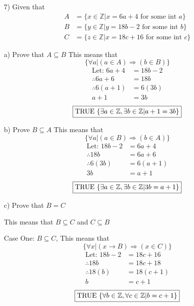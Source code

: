 \documentclass[11pt]{article}
\newcommand*{\mybox}[1]{\framebox{#1}}
\begin{document}
\begin{flushleft}

7) Given that
\vspace{-5mm}
\begin{align*}
A &= \{ x \in \mathbb{Z} | x=6a+4 \text{ for some int }a \}\\
B &= \{ y \in \mathbb{Z} | y=18b-2 \text{ for some int }b \}\\
C &= \{ z \in \mathbb{Z} | x=18c+16 \text{ for some int }c \}
\end{align*}

a) Prove that $A\subseteq B$
\vspace{-5mm}
This means that $$\{ \forall a | (a\in A)\Rightarrow (b\in B)\}$$
\vspace{-9mm}
\begin{align*}
\text{Let: }6a+4 &= 18b-2\\
\therefore 6a+6 &= 18b\\
\therefore 6(a+1) &= 6(3b)\\
a+1&=3b
\end{align*}
\vspace{-7mm}
$$\text{\mybox{TRUE $\{ \exists a \in \mathbb{Z} , \exists b \in \mathbb{Z} | a+1=3b \}  $}}$$

b) Prove $B\subseteq A$ 
\vspace{-5mm}
This means that $$\{ \forall a | (a\in B)\Rightarrow (b\in A)\}$$
\vspace{-9mm}
\begin{align*}
\text{Let: } 18b-2 &= 6a+4\\
\therefore 18b &= 6a+6\\
\therefore 6(3b) &= 6(a+1)\\
3b&=a+1
\end{align*}
\vspace{-7mm}
$$\text{\mybox{TRUE $\{ \exists a \in \mathbb{Z} , \exists b \in \mathbb{Z} | 3b=a+1 \}  $}}$$

c) Prove that $B=C$ 

This means that $B\subseteq C$ and $C\subseteq B$

Case One: $B\subseteq C$, This means that $$\{ \forall x | (x\to B)\Rightarrow (x\in C) \}$$
\vspace{-9mm}
\begin{align*}
\text{Let: } 18b-2 &= 18c+16\\
\therefore 18b &= 18c+18\\
\therefore 18(b) &= 18(c+1) \\
b&=c+1
\end{align*}
\vspace{-7mm}
$$\text{\mybox{TRUE $\{ \forall b \in \mathbb{Z} , \forall c \in \mathbb{Z} | b=c+1 \}  $}}$$


\end{flushleft}
\end{document}
